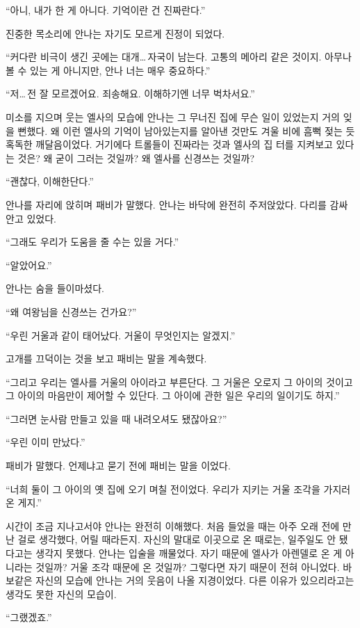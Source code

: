 ``아니, 내가 한 게 아니다. 기억이란 건 진짜란다.''

진중한 목소리에 안나는 자기도 모르게 진정이 되었다.

``커다란 비극이 생긴 곳에는 대개\ldots\,자국이 남는다. 고통의 메아리 같은 것이지. 아무나 볼 수 있는 게 아니지만, 안나 너는 매우 중요하다.''

``저\ldots\,전 잘 모르겠어요. 죄송해요. 이해하기엔 너무 벅차서요.''

미소를 지으며 웃는 엘사의 모습에 안나는 그 무너진 집에 무슨 일이 있었는지 거의 잊을 뻔했다. 왜 이런 엘사의 기억이 남아있는지를 알아낸 것만도 겨울 비에 흠뻑 젖는 듯 혹독한 깨달음이었다. 거기에다 트롤들이 진짜라는 것과 엘사의 집 터를 지켜보고 있다는 것은? 왜 굳이 그러는 것일까? 왜 엘사를 신경쓰는 것일까?

``괜찮다, 이해한단다.''

안나를 자리에 앉히며 패비가 말했다. 안나는 바닥에 완전히 주저앉았다. 다리를 감싸 안고 있었다.

``그래도 우리가 도움을 줄 수는 있을 거다.''

``알았어요.''

안나는 숨을 들이마셨다.

``왜 여왕님을 신경쓰는 건가요?''

``우린 거울과 같이 태어났다. 거울이 무엇인지는 알겠지.''

고개를 끄덕이는 것을 보고 패비는 말을 계속했다.

``그리고 우리는 엘사를 거울의 아이라고 부른단다. 그 거울은 오로지 그 아이의 것이고 그 아이의 마음만이 제어할 수 있단다. 그 아이에 관한 일은 우리의 일이기도 하지.''

``그러면 눈사람 만들고 있을 때 내려오셔도 됐잖아요?''

``우린 이미 만났다.''

패비가 말했다. 언제냐고 묻기 전에 패비는 말을 이었다.

``너희 둘이 그 아이의 옛 집에 오기 며칠 전이었다. 우리가 지키는 거울 조각을 가지러 온 게지.''

시간이 조금 지나고서야 안나는 완전히 이해했다. 처음 들었을 때는 아주 오래 전에 만난 걸로 생각했다, 어릴 때라든지. 자신의 말대로 이곳으로 온 때로는, 일주일도 안 됐다고는 생각지 못했다. 안나는 입술을 깨물었다. 자기 때문에 엘사가 아렌델로 온 게 아니라는 것일까? 거울 조각 때문에 온 것일까? 그렇다면 자기 때문이 전혀 아니었다. 바보같은 자신의 모습에 안나는 거의 웃음이 나올 지경이었다. 다른 이유가 있으리라고는 생각도 못한 자신의 모습이.

``그랬겠죠.''

